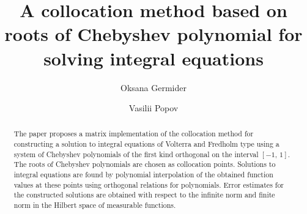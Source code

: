 \begin{englishtitle} %
\title{A collocation method based on roots of Chebyshev polynomial for solving integral equations}
\author{Oksana Germider  \and  Vasilii Popov
}

\maketitle

\begin{abstract}
The paper proposes a matrix implementation of the collocation method for constructing a solution to integral equations of Volterra and Fredholm type using a system of Chebyshev polynomials of the first kind orthogonal on the interval $[-1,\,1]$. The roots of Chebyshev polynomials are chosen as collocation points. Solutions to integral equations are found by polynomial interpolation of the obtained function values at these points using orthogonal relations for polynomials. Error estimates for the constructed solutions are obtained with respect to the infinite norm and finite norm in the Hilbert space of measurable functions.

\end{abstract}
\end{englishtitle}

\iffalse
%
%


\documentclass[12pt]{llncs}


\usepackage{iftex}

\ifPDFTeX
\usepackage[T2A]{fontenc}
\usepackage[utf8]{inputenc} %
\usepackage[english,russian]{babel}
\fi

